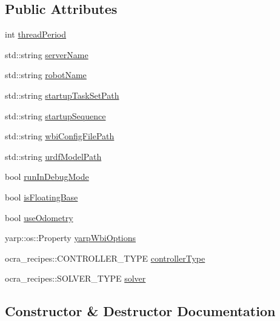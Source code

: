 \subsection*{Public Attributes}
\begin{DoxyCompactItemize}
\item 
int \hyperlink{classOcraControllerOptions_ab706ae593bf5b30433cfd6f957b51db4}{thread\+Period}
\item 
std\+::string \hyperlink{classOcraControllerOptions_a22380b083fbf0b202993d0415d1d4c83}{server\+Name}
\item 
std\+::string \hyperlink{classOcraControllerOptions_a897948011f23b08ba20e1707033458d4}{robot\+Name}
\item 
std\+::string \hyperlink{classOcraControllerOptions_af91566ecff3f7ed02571369c7af061ce}{startup\+Task\+Set\+Path}
\item 
std\+::string \hyperlink{classOcraControllerOptions_ab01efbd786ad8bc5beb6de02dbcd0936}{startup\+Sequence}
\item 
std\+::string \hyperlink{classOcraControllerOptions_af3a98210531cf667c2838e45b470a66e}{wbi\+Config\+File\+Path}
\item 
std\+::string \hyperlink{classOcraControllerOptions_a697196e6267b2a519dd0bcc2bc03ab73}{urdf\+Model\+Path}
\item 
bool \hyperlink{classOcraControllerOptions_a26dce90c0e6cf7ba608020d01cd08f3c}{run\+In\+Debug\+Mode}
\item 
bool \hyperlink{classOcraControllerOptions_a1edf322553d88c1ac2bf8947e9d942d7}{is\+Floating\+Base}
\item 
bool \hyperlink{classOcraControllerOptions_a335f09b446b6d10e2a8e6eb453391d9e}{use\+Odometry}
\item 
yarp\+::os\+::\+Property \hyperlink{classOcraControllerOptions_ac3965bdcce6cb2ce3e4a335f855acd63}{yarp\+Wbi\+Options}
\item 
ocra\+\_\+recipes\+::\+C\+O\+N\+T\+R\+O\+L\+L\+E\+R\+\_\+\+T\+Y\+PE \hyperlink{classOcraControllerOptions_aa533fe11c53b7fb17105f1edf48e1c0d}{controller\+Type}
\item 
ocra\+\_\+recipes\+::\+S\+O\+L\+V\+E\+R\+\_\+\+T\+Y\+PE \hyperlink{classOcraControllerOptions_af79b8705c3f3097b642262bc877eaa8e}{solver}
\end{DoxyCompactItemize}


\subsection{Constructor \& Destructor Documentation}
\hypertarget{classOcraControllerOptions_a1a91de992c42c6da488e95cd594eca80}{}\label{classOcraControllerOptions_a1a91de992c42c6da488e95cd594eca80} 
